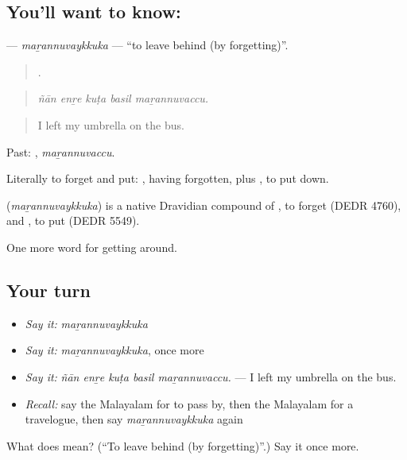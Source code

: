 \subsection*{You'll want to know: }
\textbf{} — \emph{maṟannuvaykkuka} — \textquotedblleft{}to leave behind (by forgetting)\textquotedblright{}.

\begin{quote}
    .
\end{quote}

\begin{quote}
\emph{ñān enṟe kuṭa basil maṟannuvaccu.}
\end{quote}

\begin{quote}
I left my umbrella on the bus.
\end{quote}

Past: , \emph{maṟannuvaccu}.

Literally to forget and put: , having forgotten, plus , to put down.

\begin{cousinweb}
\textbf{} (\emph{maṟannuvaykkuka}) is a native Dravidian compound of , to forget (DEDR 4760), and , to put (DEDR 5549).
\end{cousinweb}

\begin{grammarlens}[title={What you've built}]
One more word for getting around.
\end{grammarlens}

\subsection*{Your turn}
\begin{itemize}
\raggedright
  \item \emph{Say it:} \emph{maṟannuvaykkuka}
  \item \emph{Say it:} \emph{maṟannuvaykkuka}, once more
  \item \emph{Say it:} \emph{ñān enṟe kuṭa basil maṟannuvaccu.} — I left my umbrella on the bus.
  \item \emph{Recall:} say the Malayalam for to pass by, then the Malayalam for a travelogue, then say \emph{maṟannuvaykkuka} again
\end{itemize}

\begin{tcolorbox}[breakable,colback=teal!4,colframe=teal!35!black,title={Before you move on}]
What does  mean? (\textquotedblleft{}To leave behind (by forgetting)\textquotedblright{}.) Say it once more.
\end{tcolorbox}
